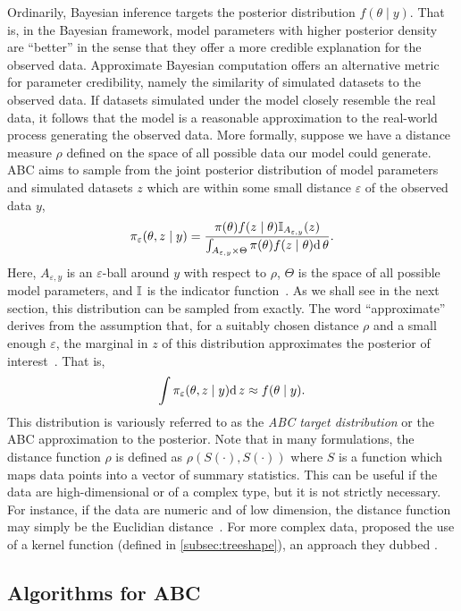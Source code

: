 Ordinarily, Bayesian inference targets the posterior distribution $f(\theta
\mid y)$. That is, in the Bayesian framework, model parameters with higher
posterior density are ``better'' in the sense that they offer a more credible
explanation for the observed data. Approximate Bayesian computation offers an
alternative metric for parameter credibility, namely the similarity of
simulated datasets to the observed data. If datasets simulated under the model
closely resemble the real data, it follows that the model is a reasonable
approximation to the real-world process generating the observed data. More
formally, suppose we have a distance measure $\rho$ defined on the space of all
possible data our model could generate. \gls{ABC} aims to sample from the joint
posterior distribution of model parameters and simulated datasets $z$ which are
within some small distance $\varepsilon$ of the observed data $y$,
\[
  \pi_{\varepsilon}(\theta, z \mid y) =
  \frac{\pi(\theta) f(z \mid \theta) \mathbb{I}_{A_{\varepsilon, y}} (z)}
  {\int_{A_{\varepsilon, y} \times \Theta} \pi(\theta) f(z \mid \theta) \mathrm{d}\, \theta}.
\]
Here, $A_{\varepsilon, y}$ is an $\varepsilon$-ball around $y$ with
respect to $\rho$, $\Theta$ is the space of all possible model parameters, and
$\mathbb{I}$ is the indicator function~\autocite{marin2012approximate}. As we shall
see in the next section, this distribution can be sampled from exactly. The
word ``approximate'' derives from the assumption that, for a suitably chosen
distance $\rho$ and a small enough $\varepsilon$, the marginal in $z$ of
this distribution approximates the posterior of
interest~\autocite{marin2012approximate}. That is,
\[
  \int \pi_\varepsilon(\theta, z \mid y) \mathrm{d}\, z \approx f(\theta \mid y).
\]
This distribution is variously referred to as the  \textit{\gls{ABC} target
distribution} or the \gls{ABC} approximation to the posterior. Note that in
many formulations, the distance function $\rho$ is defined as $\rho(S(\cdot),
S(\cdot))$ where $S$ is a function which maps data points into a vector of
summary statistics. This can be useful if the data are high-dimensional or of a
complex type, but it is not strictly necessary. For instance, if the data are
numeric and of low dimension, the distance function may simply be the Euclidian
distance~\autocite{sisson2007sequential}. For more complex data,
\textcite{nakagome2013kernel} proposed the use of a kernel function (defined in
\cref{subsec:treeshape}), an approach they dubbed .

\subsection{Algorithms for ABC}
\label{subsec:abcalg}

